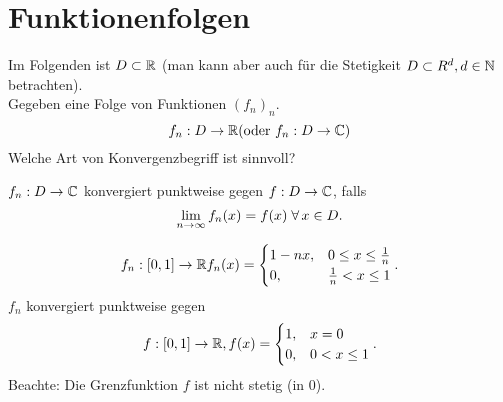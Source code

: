 \documentclass[../ana1.tex]{subfiles}
\begin{document}
\setcounter{section}{19}
\section{Funktionenfolgen}

Im Folgenden ist \( D \subset \mathbb{R} \) (man kann aber auch 
für die Stetigkeit \( D \subset R^d, d \in \mathbb{N} \) betrachten). \\
Gegeben eine Folge von Funktionen \( {(f_n)}_n \).
\[ f_n: D \rightarrow \mathbb{R} (\text{oder } f_n: D \rightarrow \mathbb{C}) \]
Welche Art von Konvergenzbegriff ist sinnvoll?
\begin{defi}
    \( f_n : D \rightarrow \mathbb{C} \) konvergiert punktweise 
    gegen \( f: D \rightarrow \mathbb{C} \), falls 
    \[ \lim\limits_{n\rightarrow\infty} f_n(x) = f(x) \; \forall \, x \in D. \]
\end{defi}
\begin{bsp}
    \[ f_n: [0,1] \rightarrow \mathbb{R} f_n(x) = \begin{cases}
        1 - nx, &0 \leq x \leq \frac{1}{n} \\
        0, &\frac{1}{n} < x \leq 1
    \end{cases}. \]
    \( f_n \) konvergiert punktweise gegen 
    \[ f: [0,1] \rightarrow \mathbb{R}, f(x) = 
    \begin{cases}
        1, &x = 0 \\
        0, &0 < x \leq 1
    \end{cases}. \]
    Beachte: Die Grenzfunktion \(f\) ist nicht stetig 
    (in \(0\)).
\end{bsp}
\end{document}
